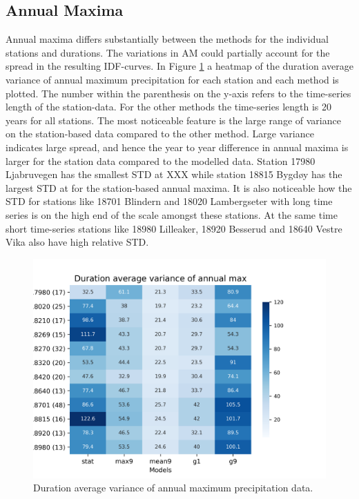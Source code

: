 \subsection{Annual Maxima}

Annual maxima differs substantially between the methods for the individual stations and durations. The variations in AM could partially account for the spread in the resulting IDF-curves. In Figure \ref{fig:AM_dur} a heatmap of the duration average variance of annual maximum precipitation for each station and each method is plotted. The number within the parenthesis on the y-axis refers to the time-series length of the station-data. For the other methods the time-series length is 20 years for all stations. The most noticeable feature is the large range of variance on the station-based data compared to the other method. Large variance indicates large spread, and hence the year to year difference in annual maxima is larger for the station data compared to the modelled data. Station 17980 Ljabruvegen has the smallest STD at XXX while station 18815 Bygdøy has the largest STD at for the station-based annual maxima. It is also noticeable how the STD for stations like 18701 Blindern and 18020 Lambergseter with long time series is on the high end of the scale amongst these stations. At the same time short time-series stations like 18980 Lilleaker, 18920 Besserud and 18640 Vestre Vika also have high relative STD.  

\begin{figure}[hbt!]
    \centering
    \includegraphics[scale=0.6]{figures/AM_dur_avg_variance.png}
    \caption{Duration average variance of annual maximum precipitation data.}
    \label{fig:AM_dur}
\end{figure}

